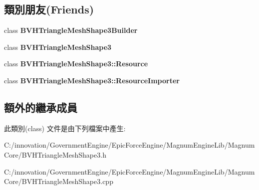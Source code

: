 \subsection*{類別朋友(Friends)}
\begin{DoxyCompactItemize}
\item 
class {\bfseries B\+V\+H\+Triangle\+Mesh\+Shape3\+Builder}\hypertarget{class_i_dream_sky_1_1_b_v_h_triangle_mesh_shape3_1_1_resource_a0f649365ade947ac32bf9c7a71b53fef}{}\label{class_i_dream_sky_1_1_b_v_h_triangle_mesh_shape3_1_1_resource_a0f649365ade947ac32bf9c7a71b53fef}

\item 
class {\bfseries B\+V\+H\+Triangle\+Mesh\+Shape3}\hypertarget{class_i_dream_sky_1_1_b_v_h_triangle_mesh_shape3_1_1_resource_a7d93684b283f743d08e2f2bd03a8bbec}{}\label{class_i_dream_sky_1_1_b_v_h_triangle_mesh_shape3_1_1_resource_a7d93684b283f743d08e2f2bd03a8bbec}

\item 
class {\bfseries B\+V\+H\+Triangle\+Mesh\+Shape3\+::\+Resource}\hypertarget{class_i_dream_sky_1_1_b_v_h_triangle_mesh_shape3_1_1_resource_ac4877a9b420bd82dfa94ecb349aaf30c}{}\label{class_i_dream_sky_1_1_b_v_h_triangle_mesh_shape3_1_1_resource_ac4877a9b420bd82dfa94ecb349aaf30c}

\item 
class {\bfseries B\+V\+H\+Triangle\+Mesh\+Shape3\+::\+Resource\+Importer}\hypertarget{class_i_dream_sky_1_1_b_v_h_triangle_mesh_shape3_1_1_resource_a4cabc043c009b59e57956377e8726767}{}\label{class_i_dream_sky_1_1_b_v_h_triangle_mesh_shape3_1_1_resource_a4cabc043c009b59e57956377e8726767}

\end{DoxyCompactItemize}
\subsection*{額外的繼承成員}


此類別(class) 文件是由下列檔案中產生\+:\begin{DoxyCompactItemize}
\item 
C\+:/innovation/\+Government\+Engine/\+Epic\+Force\+Engine/\+Magnum\+Engine\+Lib/\+Magnum\+Core/B\+V\+H\+Triangle\+Mesh\+Shape3.\+h\item 
C\+:/innovation/\+Government\+Engine/\+Epic\+Force\+Engine/\+Magnum\+Engine\+Lib/\+Magnum\+Core/B\+V\+H\+Triangle\+Mesh\+Shape3.\+cpp\end{DoxyCompactItemize}
